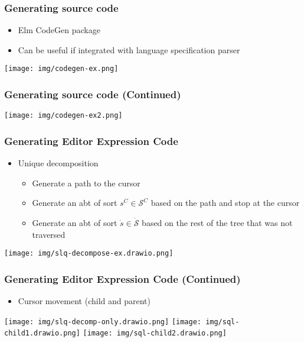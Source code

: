 \documentclass[t,24pt,aspectratio=169]{beamer}
\begin{document}
\begin{frame}[hvid]
    \frametitle{Generating source code}
    \begin{multicols}{2}
        \begin{itemize}
            \item Elm CodeGen package
            \item Can be useful if integrated with language specification parser
        \end{itemize}
        \columnbreak
        \texttt{[image: img/codegen-ex.png]}
    \end{multicols}
\end{frame}

\begin{frame}[hvid]
    \frametitle{Generating source code (Continued)}
    \begin{center}
        \texttt{[image: img/codegen-ex2.png]}
    \end{center}
\end{frame}

\begin{frame}[hvid]
    \frametitle{Generating Editor Expression Code}
    \begin{multicols}{2}
        \begin{itemize}
            \item Unique decomposition
                  \begin{itemize}
                      \item Generate a path to the cursor
                      \item Generate an abt of sort $s^C \in \mathcal{S}^C$ based on the path and stop at the cursor
                      \item Generate an abt of sort $\dot{s} \in \dot{\mathcal{S}}$
                            based on the rest of the tree that was not traversed
                  \end{itemize}
        \end{itemize}
        \columnbreak
        \texttt{[image: img/slq-decompose-ex.drawio.png]}
    \end{multicols}
\end{frame}

\begin{frame}[hvid]
    \frametitle{Generating Editor Expression Code (Continued)}
    \begin{itemize}
        \item Cursor movement (child and parent)
    \end{itemize}
    \texttt{[image: img/slq-decomp-only.drawio.png]}
    \texttt{[image: img/sql-child1.drawio.png]}
    \texttt{[image: img/sql-child2.drawio.png]}
\end{frame}
\end{document}

